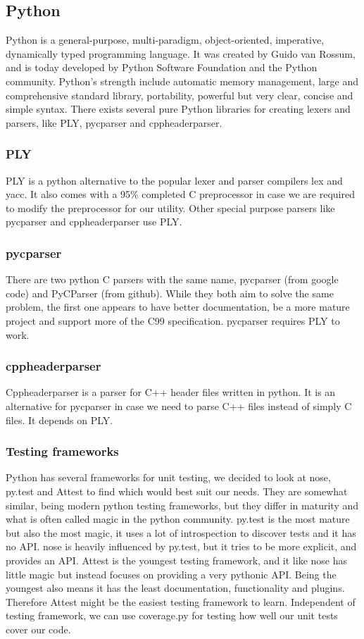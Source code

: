 \begin{description}
\subsection{Python}
Python is a general-purpose, multi-paradigm, object-oriented, imperative,
dynamically typed programming language. It was created by Guido van Rossum,
and is today developed by Python Software Foundation and the Python community.
Python’s strength include automatic memory management, large and comprehensive
standard library, portability, powerful but very clear, concise and simple
syntax. There exists several pure Python libraries for creating lexers and
parsers, like PLY, pycparser and cppheaderparser.

\subsubsection{PLY}
PLY is a python alternative to the popular lexer and parser compilers lex and
yacc. It also comes with a 95\% completed C preprocessor in case we are
required to modify the preprocessor for our utility. Other special purpose
parsers like pycparser and cppheaderparser use PLY.

\subsubsection{pycparser}
There are two python C parsers with the same name, pycparser (from google code)
and PyCParser (from github). While they both aim to solve the same problem, the
first one appears to have better documentation, be a more mature project and
support more of the C99 specification. pycparser requires PLY to work.

\subsubsection{cppheaderparser}
Cppheaderparser is a parser for C++ header files written in python. It is an
alternative for pycparser in case we need to parse C++ files instead of simply
C files. It depends on PLY.

\subsubsection{Testing frameworks}
Python has several frameworks for unit testing, we decided to look at nose,
py.test and Attest to find which would best suit our needs. They are somewhat
similar, being modern python testing frameworks, but they differ in maturity
and what is often called magic in the python community. py.test is the most
mature but also the most magic, it uses a lot of introspection to discover
tests and it has no API. nose is heavily influenced by py.test, but it tries to
be more explicit, and provides an API. Attest is the youngest testing
framework, and it like nose has little magic but instead focuses on providing
a very pythonic API. Being the youngest also means it has the least
documentation, functionality and plugins. Therefore Attest might be the easiest
testing framework to learn. Independent of testing framework, we can use
coverage.py for testing how well our unit tests cover our code.


\end{description}
